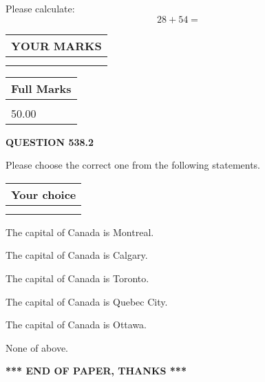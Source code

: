 \documentclass[12pt]{article}
\begin{document}
  
 
Please calculate:
\begin{equation}
28 +  %
54 = \nonumber
\end{equation}
 

 

 
  
\vspace{0.2in}
  
\noindent\begin{tabular}{|l|}
\hline
 YOUR MARKS  \\
\hline
 \\ 
 \\ 
\hline
\end{tabular}
\hspace{0.05in} \begin{tabular}{|l|}
\hline
 Full Marks  \\
\hline
 \\ 
50.00 \\
\hline
\end{tabular}
{\textbf{\Large{QUESTION
538.2 
}}}
  
  
Please choose the correct one from the following statements.
  
  
\noindent\hspace{3.0in} \begin{tabular}{|l|}
\hline
Your choice \\
\hline
 \\ 
 \\ 
\hline
\end{tabular}
  
  
 
 
The capital of Canada is Montreal.
 
 
The capital of Canada is Calgary.
 
 
The capital of Canada is Toronto.
 
 
The capital of Canada is Quebec City.
 
 
The capital of Canada is Ottawa.
 
 
 None of above.
 
 
   
   
 \vspace{0.2in}
 
   
   
   
   
\vspace{1.0in} 
{\textbf{\large{ *** END OF PAPER, THANKS *** }}} 
   
\end{document}
